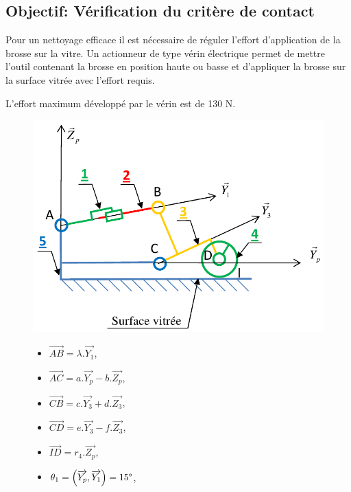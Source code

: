\subsection{Objectif: Vérification du critère de contact}
 
Pour un nettoyage efficace il est nécessaire de réguler l'effort d'application de la brosse sur la vitre. Un actionneur de type vérin électrique permet de mettre l'outil contenant la brosse en position haute ou basse et d'appliquer la brosse sur la surface vitrée avec l'effort requis.

L'effort maximum développé par le vérin est de 130 N. 



\begin{figure}[!h]
 \begin{minipage}{0.4\linewidth}
 \centering\includegraphics[width=\linewidth]{img/robuglass_cin.png}
 \end{minipage}
 \hfill
 \begin{minipage}{0.3\linewidth}
  \small
  \begin{itemize}
   \item $\overrightarrow{AB}=\lambda.\overrightarrow{Y_1}$,
   \item $\overrightarrow{AC}=a.\overrightarrow{Y_p}-b.\overrightarrow{Z_p}$,
   \item $\overrightarrow{CB}=c.\overrightarrow{Y_3}+d.\overrightarrow{Z_3}$,
   \item $\overrightarrow{CD}=e.\overrightarrow{Y_3}-f.\overrightarrow{Z_3}$,
   \item $\overrightarrow{ID}=r_4.\overrightarrow{Z_p}$,
   \item $\theta_1=\left(\overrightarrow{Y_p},\overrightarrow{Y_1}\right)=15\degree$,

\end{itemize}
\end{minipage}
\end{figure}
